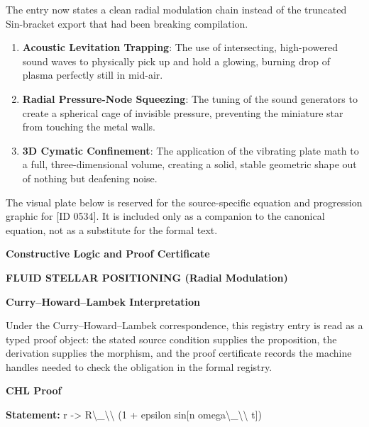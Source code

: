 The entry now states a clean radial modulation chain instead of the truncated Sin-bracket export that had been breaking compilation.
\endgroup

\begin{enumerate}[leftmargin=1.6em,itemsep=6pt,topsep=4pt]
\item \textbf{Acoustic Levitation Trapping}: The use of intersecting, high-powered sound waves to physically pick up and hold a glowing, burning drop of plasma perfectly still in mid-air.
\item \textbf{Radial Pressure-Node Squeezing}: The tuning of the sound generators to create a spherical cage of invisible pressure, preventing the miniature star from touching the metal walls.
\item \textbf{3D Cymatic Confinement}: The application of the vibrating plate math to a full, three-dimensional volume, creating a solid, stable geometric shape out of nothing but deafening noise.
\end{enumerate}

\begingroup\footnotesize\sloppy
The visual plate below is reserved for the source-specific equation and progression graphic for [ID 0534]. It is included only as a companion to the canonical equation, not as a substitute for the formal text.
\par\endgroup
\ifTZPDarkEdition
{}
\fi

\clearpage
\begingroup\tzpsupportsetup
\noindent\textbf{\fontsize{10.8pt}{12.8pt}\selectfont [ID 0534] Constructive Logic and Proof Certificate}\par
\noindent\textbf{\fontsize{10pt}{12pt}\selectfont FLUID STELLAR POSITIONING (Radial Modulation)}\par
\vspace{0.45em}
\begingroup
\footnotesize
\setlength{\parskip}{0.22em}
\setlength{\parindent}{0pt}
\noindent\textbf{Curry--Howard--Lambek Interpretation}\par
Under the Curry--Howard--Lambek correspondence, this registry entry is read as a typed proof
object: the stated source condition supplies the proposition, the derivation supplies the
morphism, and the proof certificate records the machine handles needed to check the obligation
in the formal registry.

\vspace{0.45em}
\noindent\textbf{CHL Proof}\par
\textbf{Statement:} r -> R\textbackslash{}\_\textbackslash{}\textbackslash{} (1 + epsilon sin[n omega\textbackslash{}\_\textbackslash{}\textbackslash{} t])


